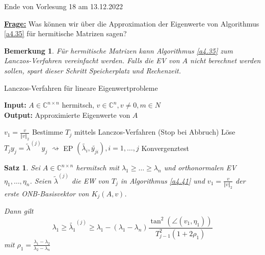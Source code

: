 \documentclass{book}
\newtheorem{theorem}[algorithm]{Satz}
\newtheorem{remark}[algorithm]{Bemerkung}
\def\C{\mathbb{C}}
\begin{document}
        \noindent
        \xrfill[0.7ex]{1pt}Ende von Vorlesung 18 am 13.12.2022\xrfill[0.7ex]{1pt}
        
            \underline{\textbf{Frage:}} Was können wir über die Approximation der Eigenwerte 
            von Algorithmus \ref{a4.35} für hermitische Matrizen sagen?

            \begin{remark}\label{b4.40}
                Für hermitische Matrizen kann Algorithmus \ref{a4.35} zum Lanczos-Verfahren vereinfacht werden.
                Falls die EV von $A$ nicht berechnet werden sollen, spart dieser Schritt Speicherplatz und Rechenzeit.
            \end{remark}

            \begin{algorithm}[H]
                        \caption{Lanczos-Verfahren für lineare Eigenwertprobleme}\label{a4.41}
                    \textbf{Input:} $A\in\C^{n\times n}$ hermitsch, $v\in\C^n,v\neq 0,m\in N$\\
                    \textbf{Output:} Approximierte Eigenwerte von $A$
                    \begin{algorithmic}
                    \State $v_1=\frac{v}{\left\Vert v \right\Vert_2}$
                        \State Bestimme $T_j$ mittels Lanczos-Verfahren
                        \State (Stop bei Abbruch)
                        \State Löse $T_{j}y_j=\tilde{\lambda}^{(j)}y_j$
                        \State $\rightsquigarrow$ EP $(\tilde{\lambda_i},\tilde{y_{ji}}),i=1,\dots,j$
                        \State Konvergenztest
                    \EndFor 
                    \end{algorithmic}
                \end{algorithm}
            
            \begin{theorem}\label{s4.42}
                Sei $A\in\C^{n\times n}$ hermitsch mit $\lambda_1\geq\dots\geq \lambda_n$
                und orthonormalen EV $\eta_1,\dots,\eta_n$.
                Seien $\tilde{\lambda}^{(j)}$ die EW von $T_j$ in Algorithmus \ref{a4.41} und $v_1=\frac{v}{\left\Vert v \right\Vert_2}$ der erste ONB-Basisvektor 
                von $K_j(A,v)$.
                
                Dann gilt \begin{equation*}
                    \lambda_1\geq \tilde{\lambda_1}^{(j)}\geq \lambda_1-(\lambda_1-\lambda_n)\frac{\tan^2(\angle(v_1,\eta_1))}{T_{j-1}^2(1+2\rho_1)}
                \end{equation*}
                mit $\rho_1=\frac{\lambda_1-\lambda_2}{\lambda_2-\lambda_n}$
            \end{theorem}
\end{document}
